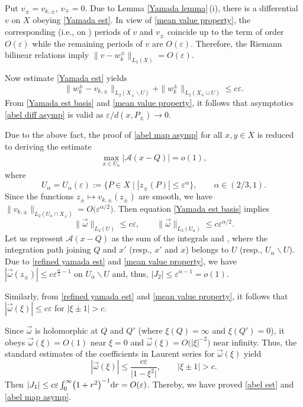 \documentclass[pdftex]{sigma}
\numberwithin{equation}{section}
\theoremstyle{definition}
\begin{document}
Put $v_\pm=v_{k,\pm}$, $v_\mp=0$. Due to Lemma \ref{Yamada lemma}\,(i), there is a differential $v$ on $X$ obeying \eqref{Yamada est}. In view of \eqref{mean value property}, the corresponding (i.e., on ) periods of $v$ and $v_{\pm}$ coincide up to the term of order $O(\varepsilon)$ while the remaining periods of $v$ are $O(\varepsilon)$. Therefore, the Riemann bilinear relations imply $\|v-w^\pm_k\|_{L_2(X)}=O(\varepsilon)$.

Now estimate \eqref{Yamada est} yields
\begin{equation}
\label{Yamada est basis}
\|w^\pm_k-v_{k,\pm}\|_{L_2(X_\pm\backslash U)}+\|w^\pm_k\|_{L_2(X_\mp\cup U)}\le c\varepsilon.
\end{equation}
From \eqref{Yamada est basis} and \eqref{mean value property}, it follows that asymptotics \eqref{abel diff asymp} is valid as $\varepsilon/ d(x,P_\pm)\to 0$.

Due to the above fact, the proof of \eqref{abel map asymp} for all $x,y\in X$ is reduced to deriving the estimate
\begin{gather}
\label{abel est}
\max_{x\in U_\alpha}|\mathscr{A}(x-Q)|=o(1),
\end{gather}
where
\[U_\alpha=U_\alpha(\varepsilon):=\{P\in X \mid |z_\pm(P)|\le\varepsilon^{\alpha}\}, \qquad \alpha\in (2/3,1).\]
Since the functions $z_\pm\mapsto v_{k,\pm}(z_\pm)$ are smooth, we have $\|v_{k,\pm}\|_{L_2(U_\alpha\cap X_\pm)}=O\bigl(\varepsilon^{\alpha/2}\bigr)$. Then equation \eqref{Yamada est basis} implies
\begin{equation}
\label{refined yamada est}
\|\vec{\omega}\|_{L_2(U)}\le c\varepsilon, \qquad \|\vec{\omega}\|_{L_2(U_\alpha)}\le c\varepsilon^{\alpha/2}.
\end{equation}
Let us represent $\mathscr{A}(x-Q)$ as the sum of the integrals  and , where the integration path joining $Q$ and $x'$ (resp., $x'$ and $x$) belongs to $U$ (resp., $U_\alpha\backslash U$). Due to \eqref{refined yamada est} and \eqref{mean value property}, we have $|\vec{\omega}(z_\pm)|\le c\varepsilon^{\frac{\alpha}{2}-1}$ on $U_\alpha\backslash U$ and, thus, $|J_2|\le \varepsilon^{\alpha-1}=o(1)$.

 Similarly, from \eqref{refined yamada est} and \eqref{mean value property}, it follows that $|\vec{\omega}(\xi)|\le c\varepsilon$ for $|\xi\pm 1|>c$.

Since $\vec{\omega}$ is holomorphic at $Q$ and $Q'$ (where $\xi(Q)=\infty$ and $\xi(Q')=0$), it obeys $\vec{\omega}(\xi)=O(1)$ near $\xi=0$ and $\vec{\omega}(\xi)=O\bigl(|\xi|^{-2}\bigr)$ near infinity. Thus, the standard estimates of the coefficients in Laurent series for $\vec{\omega}(\xi)$ yield
\[|\vec{\omega}(\xi)|\le\frac{c\varepsilon}{\big|1-\xi^2\big|}, \qquad |\xi\pm 1|>c.\]
Then $|J_1|\le c\varepsilon\int_0^{\infty}\bigl(1+r^2\bigr)^{-1}{\rm d}r=O(\varepsilon)$. Thereby, we have proved \eqref{abel est} and \eqref{abel map asymp}.
\end{document}
